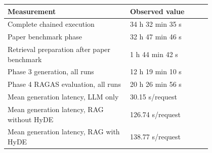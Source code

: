 \begin{tabular}{p{0.48\linewidth}p{0.32\linewidth}}
\toprule
Measurement & Observed value \\
\midrule
Complete chained execution & 34 h 32 min 35 s \\
Paper benchmark phase & 32 h 47 min 46 s \\
Retrieval preparation after paper benchmark & 1 h 44 min 42 s \\
Phase 3 generation, all runs & 12 h 19 min 10 s \\
Phase 4 RAGAS evaluation, all runs & 20 h 26 min 56 s \\
Mean generation latency, LLM only & 30.15 s/request \\
Mean generation latency, RAG without HyDE & 126.74 s/request \\
Mean generation latency, RAG with HyDE & 138.77 s/request \\
\bottomrule
\end{tabular}
